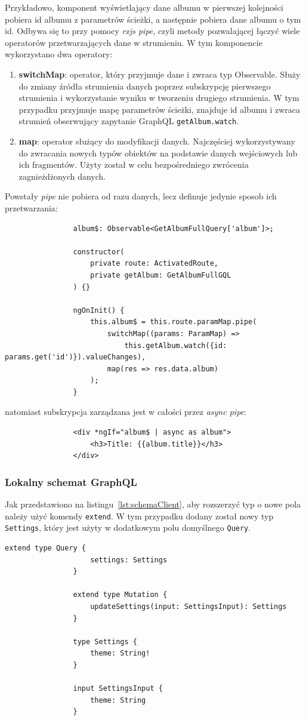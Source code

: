			Przykładowo, komponent wyświetlający dane albumu w pierwszej kolejności pobiera id albumu z parametrów ścieżki,
			a następnie pobiera dane albumu o tym id.
			Odbywa się to przy pomocy \emph{rxjs pipe}, czyli metody pozwalającej łączyć wiele operatorów przetwarzających dane w strumieniu.
			W tym komponencie wykorzystano dwa operatory:
			\begin{enumerate}
				\item \textbf{switchMap}: operator, który przyjmuje dane i zwraca typ Observable.
					Służy do zmiany źródła strumienia danych poprzez subskrypcję pierwszego strumienia i wykorzystanie wyniku w tworzeniu drugiego strumienia.
					W tym przypadku przyjmuje mapę parametrów ścieżki, znajduje id albumu i zwraca strumień obserwujący zapytanie GraphQL \verb|getAlbum.watch|.

				\item \textbf{map}: operator służący do modyfikacji danych.
					Najczęściej wykorzystywany do zwracania nowych typów obiektów na podstawie danych wejściowych lub ich fragmentów.
					Użyty został w celu bezpośredniego zwrócenia zagnieżdżonych danych.
			\end{enumerate}
			Powstały \emph{pipe} nie pobiera od razu danych, lecz definuje jedynie sposob ich przetwarzania:
			\begin{lstlisting}
				album$: Observable<GetAlbumFullQuery['album']>;

				constructor(
					private route: ActivatedRoute,
					private getAlbum: GetAlbumFullGQL
				) {}

				ngOnInit() {
					this.album$ = this.route.paramMap.pipe(
						switchMap((params: ParamMap) =>
							this.getAlbum.watch({id: params.get('id')}).valueChanges),
						map(res => res.data.album)
					);
				}
			\end{lstlisting}
			natomiast subskrypcja zarządzana jest w całości przez \emph{async pipe}:
			\begin{lstlisting}
				<div *ngIf="album$ | async as album">
					<h3>Title: {{album.title}}</h3>
				</div>
			\end{lstlisting}
			
		\subsubsection*{Lokalny schemat GraphQL}
			Jak przedstawiono na listingu~\ref{lst:schemaClient}, aby rozszerzyć typ o nowe pola należy użyć komendy \verb|extend|.
			W tym przypadku dodany został nowy typ \verb|Settings|, który jest użyty w dodatkowym polu domyślnego \verb|Query|.
			\begin{lstlisting}[label=lst:schemaClient, caption=Lokalny schemat GraphQL, float=th]
				extend type Query {
					settings: Settings
				}
				
				extend type Mutation {
					updateSettings(input: SettingsInput): Settings
				}
				
				type Settings {
					theme: String!
				}
				
				input SettingsInput {
					theme: String
				}
				
			\end{lstlisting}
			
